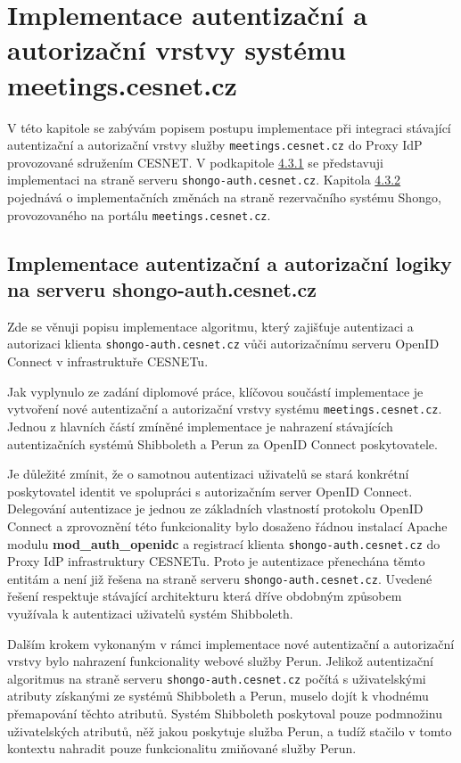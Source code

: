 \documentclass[
  printed, %
  twoside, %
  table,   %
  nolof,     %
  nolot,     %
]{fithesis3}
\begin{document}
\section{Implementace autentizační a autorizační vrstvy systému meetings.cesnet.cz}
\label{ShongoImpl}
V této kapitole se zabývám popisem postupu implementace při integraci stávající autentizační a autorizační vrstvy služby \texttt{meetings.cesnet.cz} do Proxy IdP provozované sdružením CESNET. V podkapitole \hyperref[ShongoImpl-authn]{4.3.1} se představuji implementaci na straně serveru \texttt{shongo-auth.cesnet.cz}. Kapitola \hyperref[ShongoImpl-authn]{4.3.2} pojednává o implementačních změnách na straně rezervačního systému Shongo, provozovaného na portálu \texttt{meetings.cesnet.cz}. 

\subsection{Implementace autentizační a autorizační logiky na serveru shongo-auth.cesnet.cz}
\label{ShongoImpl-authn}
Zde se věnuji popisu implementace algoritmu, který zajišťuje autentizaci a autorizaci klienta \texttt{shongo-auth.cesnet.cz} vůči autorizačnímu serveru OpenID Connect v infrastruktuře CESNETu.  \par

Jak vyplynulo ze zadání diplomové práce, klíčovou součástí implementace je vytvoření nové autentizační a autorizační vrstvy systému \texttt{meetings.cesnet.cz}. Jednou z hlavních částí zmíněné implementace je nahrazení stávajících autentizačních systémů Shibboleth a Perun za OpenID Connect poskytovatele.

\par

Je důležité zmínit, že o samotnou autentizaci uživatelů se stará konkrétní poskytovatel identit ve spolupráci s autorizačním server OpenID Connect. Delegování autentizace je jednou ze základních vlastností protokolu OpenID Connect a zprovoznění této funkcionality bylo dosaženo řádnou instalací Apache modulu \textbf{mod\_auth\_openidc} a registrací klienta \texttt{shongo-auth.cesnet.cz} do Proxy IdP infrastruktury CESNETu. Proto je autentizace přenechána těmto entitám a není již řešena na straně serveru \texttt{shongo-auth.cesnet.cz}. Uvedené řešení respektuje stávající architekturu která dříve obdobným způsobem využívala k autentizaci uživatelů systém Shibboleth. 

\par 
Dalším krokem vykonaným v rámci implementace nové autentizační a autorizační vrstvy bylo nahrazení funkcionality webové služby Perun.  
Jelikož autentizační algoritmus na straně serveru \texttt{shongo-auth.cesnet.cz} počítá s uživatelskými atributy získanými ze systémů Shibboleth a Perun, muselo dojít k vhodnému přemapování těchto atributů. Systém Shibboleth poskytoval pouze podmnožinu uživatelských atributů, něž jakou poskytuje služba Perun, a tudíž stačilo v tomto kontextu nahradit pouze funkcionalitu zmiňované služby Perun. \par
\end{document}
